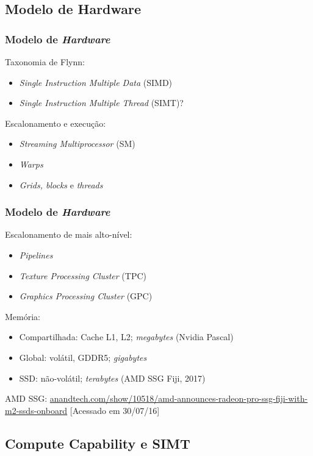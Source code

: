 \documentclass[10pt, compress, aspectratio=43, xcolor={table,usenames,dvipsnames}]{beamer}
\begin{document}
\subsection{Modelo de Hardware}

\begin{frame}
    \frametitle{Modelo de \textit{Hardware}}
    Taxonomia de Flynn:
    \begin{itemize}
        \item \textit{Single Instruction Multiple Data} (SIMD)
        \item \textit{Single Instruction Multiple Thread} (SIMT)?
    \end{itemize}
    Escalonamento e execução:
    \begin{itemize}
        \item \textit{Streaming Multiprocessor} (SM)
        \item \textit{Warps}
        \item \textit{Grids, blocks} e \textit{threads}
    \end{itemize}
\end{frame}

\begin{frame}
    \frametitle{Modelo de \textit{Hardware}}
    Escalonamento de mais alto-nível:
    \begin{itemize}
        \item \textit{Pipelines}
        \item \textit{Texture Processing Cluster} (TPC)
        \item \textit{Graphics Processing Cluster} (GPC)
    \end{itemize}
    Memória:
    \begin{itemize}
        \item Compartilhada: Cache L1, L2; \textit{megabytes} (Nvidia Pascal)
        \item Global: volátil, GDDR5; \textit{gigabytes}
        \item SSD: \alert{não-volátil}; \alert{\textit{terabytes}} (AMD SSG Fiji, 2017)
    \end{itemize}
    \vfill

    \tiny{AMD SSG: \url{anandtech.com/show/10518/amd-announces-radeon-pro-ssg-fiji-with-m2-ssds-onboard} [Acessado em 30/07/16]}
\end{frame}

\subsection{Compute Capability e SIMT}
\end{document}
